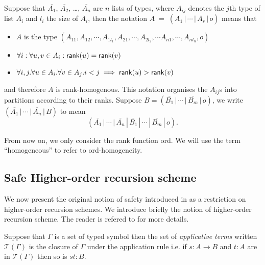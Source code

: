 Suppose that $\overline{A_1}$, $\overline{A_2}$, \ldots,
$\overline{A_n}$ are $n$ lists of types, where $A_{ij}$ denotes the
$j$th type of list $\overline{A_i}$ and $l_i$ the size of
$\overline{A_i}$, then the notation $A \; = \; (\overline{A_1} \, |
\, \cdots \, | \, \overline{A_r} \, | \, o)$ means that
\begin{itemize}
  \item $A$ is the type $(A_{11},A_{12},\cdots, A_{1l_1}, A_{21}, \cdots,A_{2l_2}, \cdots A_{n1},\cdots, A_{nl_n},o)$
  \item $\forall i: \forall u,v \in A_i : {\sf rank}(u) = {\sf rank}(v) $
  \item $\forall i,j . \forall u \in A_i . \forall v \in A_j . i<j \implies {\sf rank}(u) >
   {\sf rank}(v) $
\end{itemize}
and therefore $A$ is {\sf rank}-homogenous. This notation organises
the $A_{ij}$s into partitions according to their ranks. Suppose $B =
(\overline{B_1} \, | \, \cdots \, | \, \overline{B_m} \, | \, o)$,
we write $(\overline{A_1} \, | \, \cdots \, | \, \overline{A_n} \, |
\, {B})$ to mean
\[(\overline{A_1} \, | \, \cdots \, | \, \overline{A_n} \, | \,
\overline{B_1} \, | \, \cdots \, | \, \overline{B_m} \, | \, o).\]

From now on, we only consider the rank function {\sf ord}. We will
use the term ``homogeneous'' to refer to {\sf ord}-homogeneity.


\subsection{Safe Higher-order recursion scheme}
We now present the original notion of safety introduced in
\cite{KNU02} as a restriction on higher-order recursion schemes. We
introduce briefly the notion of higher-order recursion scheme. The
reader is refered to \cite{KNU02,demirandathesis,safety-mirlong2004}
for more details.

Suppose that $\Gamma$ is a set of typed symbol then the set of
\emph{applicative terms} written $\mathcal{T}(\Gamma)$ is the
closure of $\Gamma$ under the application rule i.e. if $s:
A\rightarrow B$ and $t:A$ are in $\mathcal{T}(\Gamma)$ then so is
$st :B$.

